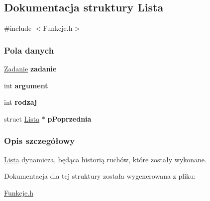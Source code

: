 \hypertarget{structLista}{}\subsection{Dokumentacja struktury Lista}
\label{structLista}


{\ttfamily \#include $<$Funkcje.\+h$>$}

\subsubsection*{Pola danych}
\begin{DoxyCompactItemize}
\item 
\mbox{\label{structLista_a53bab83cac09491f005668240f29a948}} 
\mbox{\hyperlink{Funkcje_8h_a8f8e0d34a9d3b508b7290a6300dbae08}{Zadanie}} {\bfseries zadanie}
\item 
\mbox{\label{structLista_a1a145408095bf9c45f5ce9625b5864eb}} 
int {\bfseries argument}
\item 
\mbox{\label{structLista_a1ac3ddfd089d5f35f90698b863699a65}} 
int {\bfseries rodzaj}
\item 
\mbox{\label{structLista_aa8224306b31dc945379a776c5bc308b3}} 
struct \mbox{\hyperlink{structLista}{Lista}} $\ast$ {\bfseries p\+Poprzednia}
\end{DoxyCompactItemize}


\subsubsection{Opis szczegółowy}
\mbox{\hyperlink{structLista}{Lista}} dynamicza, będąca historią ruchów, które zostały wykonane. 

Dokumentacja dla tej struktury została wygenerowana z pliku\+:\begin{DoxyCompactItemize}
\item 
\mbox{\hyperlink{Funkcje_8h}{Funkcje.\+h}}\end{DoxyCompactItemize}
